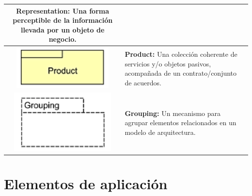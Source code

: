 \begin{longtable}{|c|p{8cm}|}
\textbf{Representation:} Una forma perceptible de la información llevada por un objeto de negocio. \\
\hline
\includegraphics{anexos/ARCHI/business/product.png} & 
\textbf{Product:} Una colección coherente de servicios y/o objetos pasivos, acompañada de un contrato/conjunto de acuerdos. \\
\hline
\includegraphics{anexos/ARCHI/business/grouping.png} &
\textbf{Grouping:} Un mecanismo para agrupar elementos relacionados en un modelo de arquitectura. \\
\end{longtable}

\section{Elementos de aplicación}

